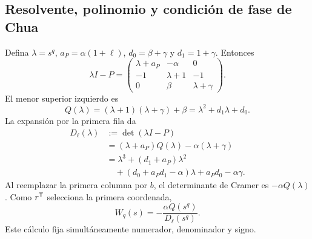 \subsection{Resolvente, polinomio y condición de fase de Chua}
\label{bre:bal:resolvent}

Defina \(\lambda=s^q\), \(a_P=\alpha(1+\ell)\),
\(d_0=\beta+\gamma\) y \(d_1=1+\gamma\). Entonces
\begin{equation}
 \lambda I-P=\begin{pmatrix}
 \lambda+a_P&-\alpha&0\\
 -1&\lambda+1&-1\\
 0&\beta&\lambda+\gamma
 \end{pmatrix}.
 \label{bre:bal:resolvent-matrix}
\end{equation}
El menor superior izquierdo es
\begin{equation}
 Q(\lambda)=(\lambda+1)(\lambda+\gamma)+\beta
 =\lambda^2+d_1\lambda+d_0.
 \label{bre:bal:minor}
\end{equation}
La expansión por la primera fila da
\begin{equation}
 \begin{aligned}
 D_\ell(\lambda)
 &:={\det}(\lambda I-P)\\
 &=(\lambda+a_P)Q(\lambda)-\alpha(\lambda+\gamma)\\
 &=\lambda^3+(d_1+a_P)\lambda^2\\
 &\quad +(d_0+a_Pd_1-\alpha)\lambda+a_Pd_0-\alpha\gamma.
 \end{aligned}
 \label{bre:bal:characteristic}
\end{equation}
Al reemplazar la primera columna por \(b\), el determinante de Cramer
es \(-\alpha Q(\lambda)\). Como \(r^{\mathsf T}\) selecciona la primera
coordenada,
\begin{equation}
 W_q(s)=-\frac{\alpha Q(s^q)}{D_\ell(s^q)}.
 \label{bre:bal:chua-transfer}
\end{equation}
Este cálculo fija simultáneamente numerador, denominador y signo.

